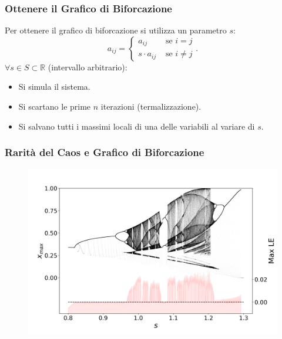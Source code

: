 \begin{frame}
\frametitle{Ottenere il Grafico di Biforcazione}
Per ottenere il grafico di biforcazione si utilizza un parametro $s$:
\[
    a_{ij} = \begin{cases}
	a_{ij} &\text{ se } i = j\\
	s\cdot a_{ij} & \text{ se } i \neq j
    \end{cases}
.\] 
$\forall s \in S \subset \mathbb{R}$ (intervallo arbitrario):
\begin{itemize}
    \item Si simula il sistema.
    \item Si scartano le prime $n$ iterazioni (termalizzazione).
    \item Si salvano tutti i massimi locali di una delle variabili al variare di $s$. 
\end{itemize}
\end{frame}

\begin{frame}
\frametitle{Rarità del Caos e Grafico di Biforcazione}
\begin{figure}[H]
    \centering
    \includegraphics[width=\textwidth]{figures/bif_diag.png}
\end{figure}
\end{frame}

